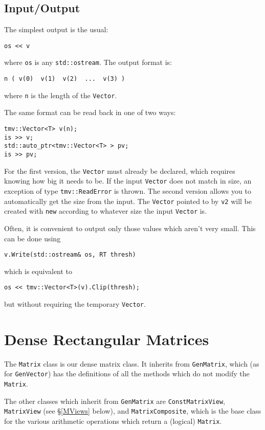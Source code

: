 \documentclass[twoside,letterpaper,11pt]{article}
\renewcommand{\tt}[1]{{\texttt {#1}}}
\begin{document}
\subsection{Input/Output}

The simplest output is the usual:
\begin{verbatim}
os << v
\end{verbatim}
where \tt{os} is any \tt{std::ostream}.
The output format is:
\begin{verbatim}
n ( v(0)  v(1)  v(2)  ...  v(3) )
\end{verbatim}
where \tt{n} is the length of the \tt{Vector}.

The same format can be read back in one of two ways:
\begin{verbatim}
tmv::Vector<T> v(n);
is >> v;
std::auto_ptr<tmv::Vector<T> > pv;
is >> pv;
\end{verbatim}
For the first version, the \tt{Vector} must already be declared, which 
requires knowing how big it needs to be.  If the input \tt{Vector} does not
match in size, an exception of type \tt{tmv::ReadError} is thrown.
The second version allows you to automatically get the size from the input.  
The \tt{Vector} pointed to by \tt{v2}
will be created with \tt{new} according to whatever size the input \tt{Vector} is.

Often, it is convenient to output only those values which aren't very small. 
This can be done using
\begin{verbatim}
v.Write(std::ostream& os, RT thresh)
\end{verbatim}
which is equivalent to
\begin{verbatim}
os << tmv::Vector<T>(v).Clip(thresh);
\end{verbatim}
but without requiring the temporary \tt{Vector}.

\newpage
\section{Dense Rectangular Matrices}

The \tt{Matrix} class is our dense matrix class.  It inherits from \tt{GenMatrix},
which (as for \tt{GenVector}) has the definitions of all the methods which 
do not modify the \tt{Matrix}.

The other classes which inherit from \tt{GenMatrix} are \tt{ConstMatrixView},
\tt{MatrixView} (see \S\ref{MViews} below), and \tt{MatrixComposite}, which 
is the base class for the various arithmetic operations which return a 
(logical) \tt{Matrix}.  
\end{document}
